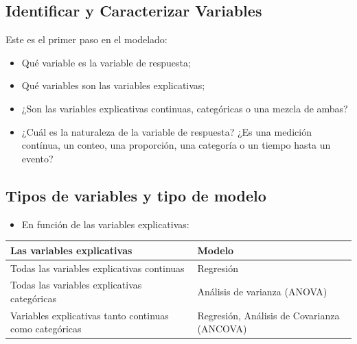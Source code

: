 \documentclass[]{book}
\providecommand{\tightlist}{%
  \setlength{\itemsep}{0pt}\setlength{\parskip}{0pt}}
\begin{document}
\subsection{Identificar y Caracterizar
Variables}\label{identificar-y-caracterizar-variables}

Este es el primer paso en el modelado:

\begin{itemize}
\item
  Qué variable es la variable de respuesta;
\item
  Qué variables son las variables explicativas;
\item
  ¿Son las variables explicativas continuas, categóricas o una mezcla de
  ambas?
\item
  ¿Cuál es la naturaleza de la variable de respuesta? ¿Es una medición
  contínua, un conteo, una proporción, una categoría o un tiempo hasta
  un evento?
\end{itemize}

\subsection{Tipos de variables y tipo de
modelo}\label{tipos-de-variables-y-tipo-de-modelo}

\begin{itemize}
\tightlist
\item
  En función de las variables explicativas:
\end{itemize}

\begin{longtable}[]{@{}ll@{}}
\toprule
\begin{minipage}[b]{0.31\columnwidth}\raggedright\strut
\textbf{Las variables explicativas}\strut
\end{minipage} & \begin{minipage}[b]{0.63\columnwidth}\raggedright\strut
\textbf{Modelo}\strut
\end{minipage}\tabularnewline
\midrule
\endhead
\begin{minipage}[t]{0.31\columnwidth}\raggedright\strut
Todas las variables explicativas continuas\strut
\end{minipage} & \begin{minipage}[t]{0.63\columnwidth}\raggedright\strut
Regresión\strut
\end{minipage}\tabularnewline
\begin{minipage}[t]{0.31\columnwidth}\raggedright\strut
Todas las variables explicativas categóricas\strut
\end{minipage} & \begin{minipage}[t]{0.63\columnwidth}\raggedright\strut
Análisis de varianza (ANOVA)\strut
\end{minipage}\tabularnewline
\begin{minipage}[t]{0.31\columnwidth}\raggedright\strut
Variables explicativas tanto continuas como categóricas\strut
\end{minipage} & \begin{minipage}[t]{0.63\columnwidth}\raggedright\strut
Regresión, Análisis de Covarianza (ANCOVA)\strut
\end{minipage}\tabularnewline
\bottomrule
\end{longtable}
\end{document}
